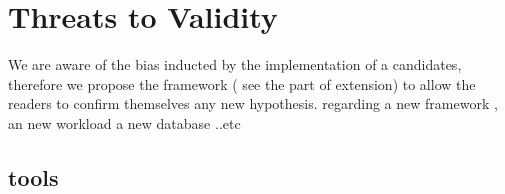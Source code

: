 


\section{Threats to Validity}
We are aware of the bias inducted by the implementation of a candidates, therefore we propose  the framework ( see the part of extension) to allow the readers to confirm themselves any new hypothesis. regarding a new framework , an new workload a new database ..etc

\subsection{tools}
